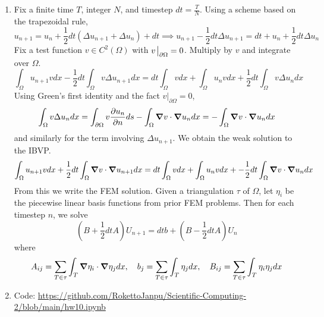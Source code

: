 \documentclass{article}
\newcommand{\imp}{\implies}
\newcommand{\ptl}{\partial}
\begin{document}
\begin{enumerate}[label=(\alph*)]
	
\item Fix a finite time $T$, integer $N$, and timestep $dt=\frac TN$. Using a scheme based on the trapezoidal rule,
$$u_{n+1} = u_n + \frac12dt(\Delta u_{n+1}+\Delta u_n) + dt
\imp u_{n+1} - \frac12dt\Delta u_{n+1} = dt + u_n + \frac12dt\Delta u_n$$
Fix a test function $v\in C^2(\Omega)$ with $v\eval_{\ptl\Omega}=0$. Multiply by $v$ and integrate over $\Omega$.
$$\int_\Omega u_{n+1}vdx - \frac12dt\int_\Omega v\Delta u_{n+1}dx = dt\int_\Omega vdx + \int_\Omega u_nvdx + \frac12dt\int_\Omega v\Delta u_ndx$$
Using Green's first identity and the fact $v|_{\ptl\Omega}=0$,
$$\int_\Omega v\Delta u_ndx = \int_{\ptl\Omega}v\pdv{u_n}{n}ds - \int_\Omega\grad v\cdot\grad u_ndx
= -\int_\Omega\grad v\cdot\grad u_ndx$$
and similarly for the term involving $\Delta u_{n+1}$. We obtain the weak solution to the IBVP.
$$\int_\Omega u_{n+1}vdx + \frac12dt\int_\Omega\grad v\cdot\grad u_{n+1}dx = dt\int_\Omega vdx + \int_\Omega u_nvdx + -\frac12dt\int_\Omega\grad v\cdot\grad u_ndx$$
From this we write the FEM solution. Given a triangulation $\tau$ of $\Omega$, let $\eta_i$ be the piecewise linear basis functions from prior FEM problems. Then for each timestep $n$, we solve 
$$(B+\frac12dtA)U_{n+1} = dtb + (B-\frac12dtA)U_n$$
where
$$A_{ij} = \sum_{T\in\tau}\int_T\grad\eta_i\cdot\grad\eta_jdx,
\quad b_j = \sum_{T\in\tau}\int_T\eta_jdx,
\quad B_{ij} = \sum_{T\in\tau}\int_T\eta_i\eta_jdx$$


\item Code: \url{https://github.com/RokettoJanpu/Scientific-Computing-2/blob/main/hw10.ipynb}
	
\end{enumerate}


	
\end{document}
